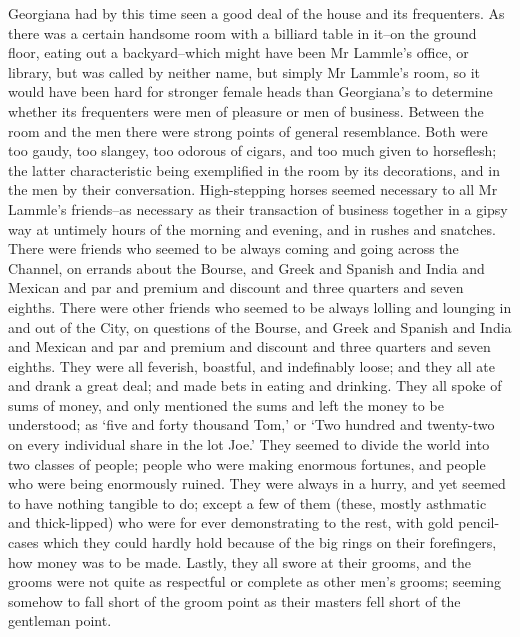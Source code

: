 Georgiana had by this time seen a good deal of the house and its
frequenters. As there was a certain handsome room with a billiard table
in it--on the ground floor, eating out a backyard--which might have
been Mr Lammle’s office, or library, but was called by neither name, but
simply Mr Lammle’s room, so it would have been hard for stronger female
heads than Georgiana’s to determine whether its frequenters were men
of pleasure or men of business. Between the room and the men there were
strong points of general resemblance. Both were too gaudy, too slangey,
too odorous of cigars, and too much given to horseflesh; the latter
characteristic being exemplified in the room by its decorations, and in
the men by their conversation. High-stepping horses seemed necessary to
all Mr Lammle’s friends--as necessary as their transaction of business
together in a gipsy way at untimely hours of the morning and evening,
and in rushes and snatches. There were friends who seemed to be always
coming and going across the Channel, on errands about the Bourse, and
Greek and Spanish and India and Mexican and par and premium and discount
and three quarters and seven eighths. There were other friends who
seemed to be always lolling and lounging in and out of the City, on
questions of the Bourse, and Greek and Spanish and India and Mexican and
par and premium and discount and three quarters and seven eighths. They
were all feverish, boastful, and indefinably loose; and they all ate and
drank a great deal; and made bets in eating and drinking. They all spoke
of sums of money, and only mentioned the sums and left the money to
be understood; as ‘five and forty thousand Tom,’ or ‘Two hundred and
twenty-two on every individual share in the lot Joe.’ They seemed to
divide the world into two classes of people; people who were making
enormous fortunes, and people who were being enormously ruined. They
were always in a hurry, and yet seemed to have nothing tangible to do;
except a few of them (these, mostly asthmatic and thick-lipped) who were
for ever demonstrating to the rest, with gold pencil-cases which they
could hardly hold because of the big rings on their forefingers, how
money was to be made. Lastly, they all swore at their grooms, and the
grooms were not quite as respectful or complete as other men’s grooms;
seeming somehow to fall short of the groom point as their masters fell
short of the gentleman point.

